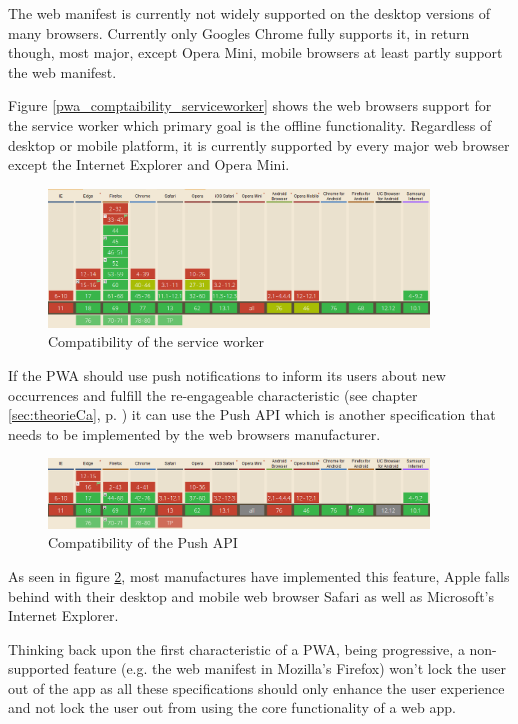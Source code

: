 The web manifest is currently not widely supported on the desktop versions of many browsers. Currently only Googles Chrome fully supports it, in return though, most major, except Opera Mini, mobile browsers at least partly support the web manifest. 

Figure \ref{pwa_comptaibility_serviceworker} shows the web browsers support for the service worker which primary goal is the offline functionality. Regardless of desktop or mobile platform, it is currently supported by every major web browser except the Internet Explorer and Opera Mini.

\begin{figure}[htbp] 
	\centering
	\includegraphics[width=0.9\textwidth]{Assets/chapter_pwa/serviceworkersupport.PNG}
	\caption{Compatibility of the service worker}
	\label{fig:pwa_comptaibility_serviceworker}
\end{figure}

If the PWA should use push notifications to inform its users about new occurrences and fulfill the re-engageable characteristic (see chapter \ref{sec:theorieCa}, p. \pageref{sec:theorieCa}) it can use the Push API which is another specification that needs to be implemented by the web browsers manufacturer.

\begin{figure}[htbp] 
	\centering
	\includegraphics[width=0.9\textwidth]{Assets/chapter_pwa/pushapisupport.PNG}
	\caption{Compatibility of the Push API}
	\label{fig:pwa_comptaibility_pushapi}
\end{figure}

As seen in figure \ref{fig:pwa_comptaibility_pushapi}, most manufactures have implemented this feature, Apple falls behind with their desktop and mobile web browser Safari as well as Microsoft’s Internet Explorer.

Thinking back upon the first characteristic of a PWA, being progressive, a non-supported feature (e.g. the web manifest in Mozilla's Firefox) won’t lock the user out of the app as all these specifications should only enhance the user experience and not lock the user out from using the core functionality of a web app.